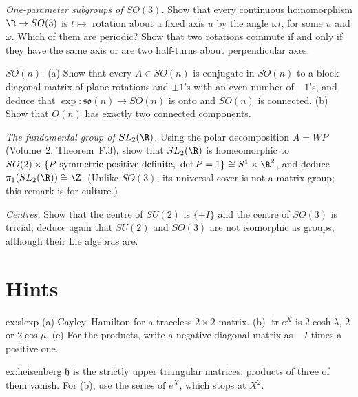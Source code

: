 \begin{exercise}[$\star$]\label{ex:oneparamso3}
\emph{One-parameter subgroups of $SO(3)$.} Show that every continuous homomorphism $\R\to SO(3)$ is $t\mapsto$ rotation about a fixed axis $u$ by the angle $\omega t$, for some $u$ and $\omega$. Which of them are periodic?
Show that two rotations commute if and only if they have the same axis or are two half-turns about perpendicular axes.
\end{exercise}

\begin{exercise}[$\star\star$]\label{ex:sondconnected}
\emph{$SO(n)$.} (a) Show that every $A\in SO(n)$ is conjugate in $SO(n)$ to a block diagonal matrix of plane rotations and $\pm1$'s with an even number of $-1$'s, and deduce that $\exp\colon\mathfrak{so}(n)\to SO(n)$ is onto and $SO(n)$ is
connected. (b) Show that $O(n)$ has exactly two connected components.
\end{exercise}

\begin{exercise}[$\star\star$]\label{ex:sl2pi1}
\emph{The fundamental group of $SL_2(\R)$.} Using the polar decomposition $A=WP$ (Volume~2, Theorem~F.3), show that $SL_2(\R)$ is homeomorphic to $SO(2)\times\{P\text{ symmetric positive definite},\ \det P=1\}\cong S^1\times\R^2$, and deduce
$\pi_1(SL_2(\R))\cong\Z$. (Unlike $SO(3)$, its universal cover is not a matrix group; this remark is for culture.)
\end{exercise}

\begin{exercise}[$\star$]\label{ex:centersu2}
\emph{Centres.} Show that the centre of $SU(2)$ is $\{\pm I\}$ and the centre of $SO(3)$ is trivial; deduce again that $SU(2)$ and $SO(3)$ are not isomorphic as groups, although their Lie algebras are.
\end{exercise}

\section{Hints}

\begin{hint}{ex:slexp}
(a) Cayley--Hamilton for a traceless $2\times2$ matrix. (b) $\operatorname{tr}e^X$ is $2\cosh\lambda$, $2$ or $2\cos\mu$. (c) For the products, write a negative diagonal matrix as $-I$ times a positive one.
\end{hint}

\begin{hint}{ex:heisenberg}
$\mathfrak h$ is the strictly upper triangular matrices; products of three of them vanish. For (b), use the series of $e^X$, which stops at $X^2$.
\end{hint}

